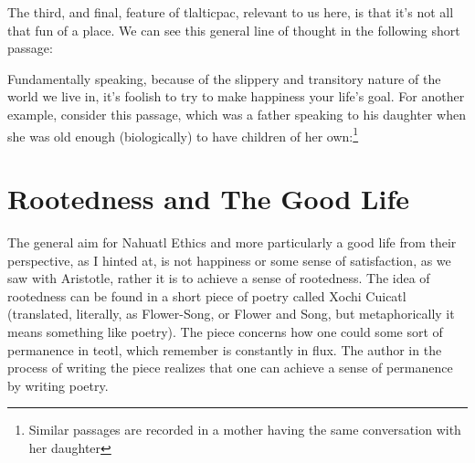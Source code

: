 The third, and final, feature of tlalticpac, relevant to us here, is that it's not all that fun of a place. We can see this general line of thought in the following short passage:

Fundamentally speaking, because of the slippery and transitory nature of the world we live in, it's foolish to try to make happiness your life's goal. For another example, consider this passage, which was a father speaking to his daughter when she was old enough (biologically) to have children of her own:\footnote{Similar passages are recorded in a mother having the same conversation with her daughter}


\section{Rootedness and The Good Life}

The general aim for Nahuatl Ethics and more particularly a good life from their perspective, as I hinted at, is not happiness or some sense of satisfaction, as we saw with Aristotle, rather it is to achieve a sense of rootedness. The idea of rootedness can be found in a short piece of poetry called Xochi Cuicatl (translated, literally, as Flower-Song, or Flower and Song, but metaphorically it means something like poetry). The piece concerns how one could some sort of permanence in teotl,  which remember is constantly in flux. The author in the process of writing the piece realizes that one can achieve a sense of permanence by writing poetry. 

